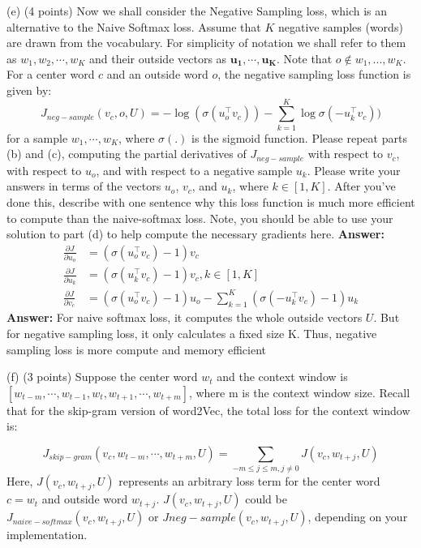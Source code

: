 \documentclass{article}
\begin{document}
\noindent(e)  (4 points) Now we shall consider the Negative Sampling loss, which is an alternative to the Naive Softmax loss. Assume that $K$ negative samples (words) are drawn from the vocabulary. For simplicity of notation we shall refer to them as $w_1, w_2, \cdots,w_K$ and their outside vectors as $\mathbf{u_1},\cdots,\mathbf{u_K}$. Note that $o \not\in {w_1,...,w_K}$.  For a center word $c$ and an outside word $o$, the negative sampling loss function is given by:
$$J_{neg-sample}(v_c, o, U) = -\log (\sigma (u_o^\intercal v_c)) - \sum_{k=1}^{K} \log \sigma(-u_k^\intercal v_c))$$
for a sample $w_1,\cdots,w_K$, where $\sigma(.)$ is the sigmoid function.
\smallbreak
Please repeat parts (b) and (c), computing the partial derivatives of $J_{neg-sample}$ with respect to $v_c$, with respect to $u_o$, and with respect  to a negative sample $u_k$. Please write your answers in terms of the vectors $u_o$, $v_c$, and $u_k$, where $k \in [1, K]$. After you’ve done this, describe with one sentence why this loss function is much more efficient to compute than the naive-softmax loss. Note, you should be able to use your solution to part (d) to help compute the necessary gradients here.
\bigbreak
\noindent
\textbf{Answer:}
\begin{align*}
\frac{\partial J}{\partial u_o} &= (\sigma(u_o^\intercal v_c) - 1)v_c \\
\frac{\partial J}{\partial u_k} &= (\sigma(u_k^\intercal v_c) - 1)v_c, k \in [1, K] \\
\frac{\partial J}{\partial v_c} &=  (\sigma(u_o^\intercal v_c) - 1)u_o - \sum_{k=1}^{K}(\sigma(-u_k^\intercal v_c)-1)u_k
\end{align*}
\textbf{Answer:} For naive softmax loss, it computes the whole outside vectors $U$.  But for negative sampling loss, it only calculates a fixed size K. Thus, negative sampling loss is more compute and memory efficient
\bigbreak

\noindent(f)  (3 points) Suppose the center word $w_t$ and the context window is $[w_{t-m}, \cdots, w_{t-1}, w_t, w_{t+1}, \cdots, w_{t+m}]$, where m is the context window size. Recall that for the skip-gram version of word2Vec, the total loss for the context window is:

\begin{equation}
J_{skip-gram}(v_c, w_{t-m}, \cdots, w_{t+m}, U) = \sum_{-m \leq j \leq m, j\ne 0} J(v_c, w_{t+j}, U)
\end{equation}
Here, $J(v_c, w_{t+j}, U)$ represents an arbitrary loss term for the center word $c = w_t$ and outside word $w_{t+j}$. $J(v_c, w_{t+j}, U)$ could be $J_{naive-softmax}(v_c, w_{t+j}, U)$ or $J{neg-sample}(v_c, w_{t+j}, U)$, depending on your implementation.
\end{document}
